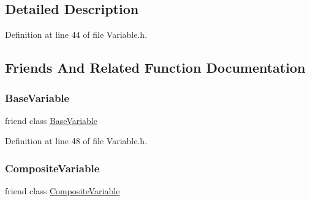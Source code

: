 \subsection{Detailed Description}


Definition at line 44 of file Variable.\+h.



\subsection{Friends And Related Function Documentation}
\hypertarget{classocra_1_1VariableHasRestrictedClassDerivation_a5136a88d8c0a1d58621286f1c82a7b45}{}\label{classocra_1_1VariableHasRestrictedClassDerivation_a5136a88d8c0a1d58621286f1c82a7b45} 
\subsubsection{\texorpdfstring{Base\+Variable}{BaseVariable}}
{\footnotesize\ttfamily friend class \hyperlink{classocra_1_1BaseVariable}{Base\+Variable}\hspace{0.3cm}{\ttfamily [friend]}}



Definition at line 48 of file Variable.\+h.

\hypertarget{classocra_1_1VariableHasRestrictedClassDerivation_a5ab4ec1f2934216b6101035293996613}{}\label{classocra_1_1VariableHasRestrictedClassDerivation_a5ab4ec1f2934216b6101035293996613} 
\subsubsection{\texorpdfstring{Composite\+Variable}{CompositeVariable}}
{\footnotesize\ttfamily friend class \hyperlink{classocra_1_1CompositeVariable}{Composite\+Variable}\hspace{0.3cm}{\ttfamily [friend]}}



